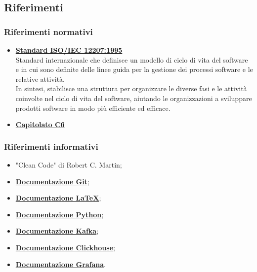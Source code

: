 \subsection{Riferimenti}
\subsubsection{Riferimenti normativi}
\begin{itemize}
    \item \href{https://www.math.unipd.it/~tullio/IS-1/2009/Approfondimenti/ISO_12207-1995.pdf}{\textbf{Standard ISO/IEC 12207:1995}} \\
    Standard internazionale che definisce un modello di ciclo di vita del software e in cui sono definite delle linee guida per la gestione dei processi software e le relative attività.\\
    In sintesi, stabilisce una struttura per organizzare le diverse fasi e le attività coinvolte nel ciclo di vita del software, aiutando le organizzazioni a sviluppare prodotti software in modo più efficiente ed efficace.

    \item \href{https://www.math.unipd.it/~tullio/IS-1/2023/Progetto/C6.pdf}{\textbf{Capitolato C6}}

\end{itemize}
\subsubsection{Riferimenti informativi}
\begin{itemize}
    \item "Clean Code" di Robert C. Martin;
    \item \href{https://git-scm.com/docs}{\textbf{Documentazione Git}};
    \item \href{https://www.latex-project.org/help/documentation/}{\textbf{Documentazione \LaTeX}};
    \item \href{https://docs.python.org/3/}{\textbf{Documentazione Python}};
    \item \href{https://kafka.apache.org/documentation/}{\textbf{Documentazione Kafka}};
    \item \href{https://clickhouse.com/docs}{\textbf{Documentazione Clickhouse}};
    \item \href{https://grafana.com/docs/grafana/latest/}{\textbf{Documentazione Grafana}}.
\end{itemize}
